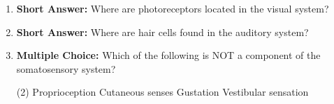 \begin{enumerate}[label=\textbf{Q2.7.\arabic*}]

      \item \textbf{Short Answer:} Where are photoreceptors located in the visual system? \\
            
      \item \textbf{Short Answer:} Where are hair cells found in the auditory system? \\

      \item \textbf{Multiple Choice:} Which of the following is NOT a component of the somatosensory system?
            \begin{tasks}[label=\textcolor{draculafg}{(\Alph*)}, item-format=\color{draculafg}, label-width=1.5em, item-indent=1.7em](2)
                  \task Proprioception
                  \task Cutaneous senses
                  \task Gustation
                  \task Vestibular sensation
            \end{tasks}


\end{enumerate}

